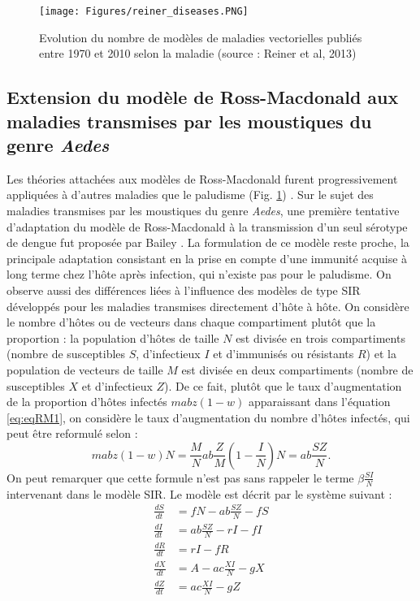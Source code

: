 \begin{figure}[t]
	\centering
	\texttt{[image: Figures/reiner\_diseases.PNG]}
	\caption{Evolution du nombre de modèles de maladies vectorielles publiés entre 1970 et 2010 selon la maladie (source : Reiner et al, 2013)}
	\label{fig:reiner_diseases}
\end{figure}


\subsection{Extension du modèle de Ross-Macdonald aux maladies transmises par les moustiques du genre {\em Aedes}}

Les théories attachées aux modèles de Ross-Macdonald furent progressivement appliquées à d'autres maladies que le paludisme (Fig. \ref{fig:reiner_diseases}) \cite{reiner_systematic_2013}.
Sur le sujet des maladies transmises par les moustiques du genre {\em Aedes}, une première tentative d'adaptation du modèle de Ross-Macdonald à la transmission d'un seul sérotype de dengue fut proposée par Bailey \cite{bailey1975mathematical,andraud2012dynamic}.
La formulation de ce modèle reste proche, la principale adaptation consistant en la prise en compte d'une immunité acquise à long terme chez l'hôte après infection, qui n'existe pas pour le paludisme. 
On observe aussi des différences liées à l'influence des modèles de type SIR développés pour les maladies transmises directement d'hôte à hôte.
On considère le nombre d'hôtes ou de vecteurs dans chaque compartiment plutôt que la proportion : la population d'hôtes de taille $N$ est divisée en trois compartiments (nombre de susceptibles $S$, d'infectieux $I$ et d'immunisés ou résistants $R$) et la population de vecteurs de taille $M$ est divisée en deux compartiments (nombre de susceptibles $X$ et d'infectieux $Z$).
De ce fait, plutôt que le taux d'augmentation de la proportion d'hôtes infectés $mabz(1-w)$ apparaissant dans l'équation \ref{eq:eqRM1}, on considère le taux d'augmentation du nombre d'hôtes infectés, qui peut être reformulé selon :
\begin{equation}
mabz(1-w)N = \frac{M}{N}ab\frac{Z}{M}(1-\frac{I}{N})N = ab\frac{SZ}{N}.
\end{equation}
On peut remarquer que cette formule n'est pas sans rappeler le terme $\beta\frac{SI}{N}$ intervenant dans le modèle SIR.
Le modèle est décrit par le système suivant :
\begin{align}
\label{eq:bailey}
\frac{dS}{dt} &= fN - ab\frac{SZ}{N} - fS \\ \nonumber
\frac{dI}{dt} &= ab\frac{SZ}{N} - rI - fI \\ \nonumber
\frac{dR}{dt} &= rI - fR \\  \nonumber
\frac{dX}{dt} &= A - ac\frac{XI}{N} - gX \\ \nonumber
\frac{dZ}{dt} &= ac\frac{XI}{N} - gZ
\end{align}
